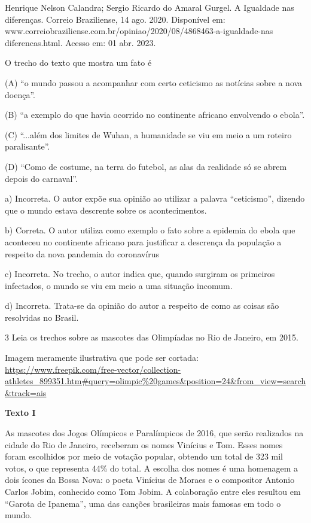 \begin{itemize}
\begin{itemize}
Henrique Nelson Calandra; Sergio Ricardo do Amaral Gurgel. A Igualdade
nas diferenças. Correio Braziliense, 14 ago. 2020. Disponível em:
www.correiobraziliense.com.br/opiniao/2020/08/4868463-a-igualdade-nas
diferencas.html. Acesso em: 01 abr. 2023.

O trecho do texto que mostra um fato é

(A) ``o mundo passou a acompanhar com certo ceticismo as notícias sobre
a nova doença''.

(B) ``a exemplo do que havia ocorrido no continente africano envolvendo
o ebola''.

(C) ``...além dos limites de Wuhan, a humanidade se viu em meio a um
roteiro paralisante''.

(D) ``Como de costume, na terra do futebol, as alas da realidade só se
abrem depois do carnaval''.

a) Incorreta. O autor expõe sua opinião ao utilizar a palavra
``ceticismo'', dizendo que o mundo estava descrente sobre os
acontecimentos.

b) Correta. O autor utiliza como exemplo o fato sobre a epidemia do
ebola que aconteceu no continente africano para justificar a descrença
da população a respeito da nova pandemia do coronavírus

c) Incorreta. No trecho, o autor indica que, quando surgiram os
primeiros infectados, o mundo se viu em meio a uma situação incomum.

d) Incorreta. Trata-se da opinião do autor a respeito de como as coisas
são resolvidas no Brasil.

\num{3} Leia os trechos sobre as mascotes das Olimpíadas no Rio de
Janeiro, em 2015.

Imagem meramente ilustrativa que pode ser cortada:
\url{https://www.freepik.com/free-vector/collection-athletes_899351.htm\#query=olimpic\%20games\&position=24\&from_view=search\&track=ais}

\textbf{Texto I}

As mascotes dos Jogos Olímpicos e Paralímpicos de 2016, que serão
realizados na cidade do Rio de Janeiro, receberam os nomes Vinícius e
Tom. Esses nomes foram escolhidos por meio de votação popular, obtendo
um total de 323 mil votos, o que representa 44\% do total. A escolha dos
nomes é uma homenagem a dois ícones da Bossa Nova: o poeta Vinícius de
Moraes e o compositor Antonio Carlos Jobim, conhecido como Tom Jobim. A
colaboração entre eles resultou em ``Garota de Ipanema'', uma das
canções brasileiras mais famosas em todo o mundo.


\end{itemize}
\end{itemize}

